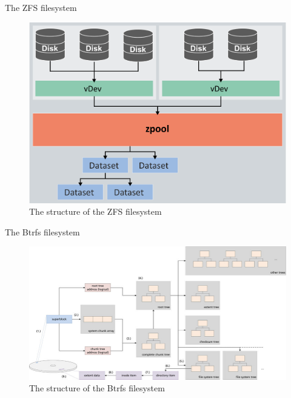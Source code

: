 \documentclass[xcolor=table]{beamer}
\begin{document}
	\begin{frame}{The ZFS filesystem}
		\begin{figure}
			\centering

			\includegraphics[width=\textwidth]{media/zfs.png}
			\caption{The structure of the ZFS filesystem }
		\end{figure}
		
	\end{frame}

	\begin{frame}{The Btrfs filesystem}
		\begin{figure}
			\centering

			\includegraphics[width=\textwidth]{media/btrfs.png}
			\caption{The structure of the Btrfs filesystem }
		\end{figure}
			
	\end{frame}
\end{document}
